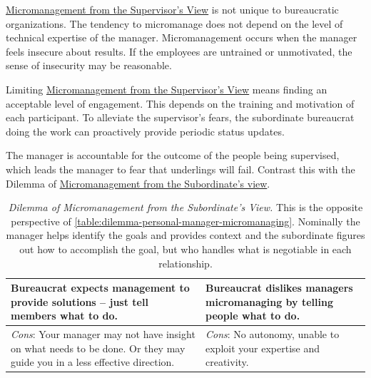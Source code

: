 \hyperref[table:dilemma-personal-manager-micromanaging]{Micromanagement from the Supervisor's View} 
\iftoggle{printedonpaper}{ (\ref{table:dilemma-personal-manager-micromanaging})}{}%
is not unique to bureaucratic organizations. The tendency to micromanage does not depend on the level of technical expertise of the manager. Micromanagement occurs when the manager feels insecure about results. If the employees are untrained or unmotivated, the sense of insecurity may be reasonable.

Limiting \hyperref[table:dilemma-personal-manager-micromanaging]{Micromanagement from the Supervisor's View}
means finding an acceptable level of engagement. This depends on the training and motivation of each participant. To alleviate the supervisor's fears, the subordinate bureaucrat doing the work can proactively provide periodic status updates. 

The manager is accountable for the outcome of the people being supervised, which leads the manager to fear that underlings will fail.  Contrast this with the Dilemma of  \hyperref[table:dilemma-personal-solution-provider]{Micromanagement from the Subordinate's view}.

\begin{center}
\begin{table}[H] %
\begin{tabular}{ | m{\dilemmatablewidth}| m{\dilemmatablewidth} | } 
  \hline
  \textbf{Bureaucrat expects management to provide solutions -- just tell members what to do.} & 
  \textbf{Bureaucrat dislikes managers micromanaging by telling people what to do.} \\ 
  \hline
  \textit{Cons}: Your manager may not have insight on what needs to be done. Or they may guide you in a less effective direction. &
  \textit{Cons}: No autonomy, unable to exploit your expertise and creativity. \\  
  \hline
\end{tabular}
\caption{\textit{Dilemma of Micromanagement from the Subordinate's View.}
This is the opposite perspective of \ref{table:dilemma-personal-manager-micromanaging}. Nominally the manager helps identify the goals and provides context and the subordinate figures out how to accomplish the goal, but who handles what is negotiable in each relationship.
}
\label{table:dilemma-personal-solution-provider}
\end{table}
\end{center}

